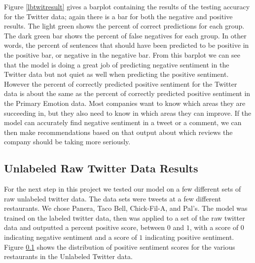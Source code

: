 \documentclass[titlepage,letterpaper]{article}
\begin{document}
Figure \ref{lbtwitresult} gives a barplot containing the results of the testing accuracy for the Twitter data; again there is a bar for both the negative and positive results. The light green shows the percent of correct predictions for each group. The dark green bar shows the percent of false negatives for each group. In other words, the percent of sentences that should have been predicted to be positive in the positive bar, or negative in the negative bar. From this barplot we can see that the model is doing a great job of predicting negative sentiment in the Twitter data but not quiet as well when predicting the positive sentiment. However the percent of correctly predicted positive sentiment for the Twitter data is about the same as the percent of correctly predicted positive sentiment in the Primary Emotion data. Most companies want to know which areas they are succeeding in, but they also need to know in which areas they can improve. If the model can accurately find negative sentiment in a tweet or a comment, we can then make recommendations based on that output about which reviews the company should be taking more seriously. 



\subsection{Unlabeled Raw Twitter Data Results}


\label{twitmeg}

For the next step in this project we tested our model on a few different sets of raw unlabeled twitter data. The data sets were tweets at a few different restaurants. We chose Panera, Taco Bell, Chick-Fil-A, and Pal's. The model was trained on the labeled twitter data, then was applied to a set of the raw twitter data and outputted a percent positive score, between $0$ and $1$, with a score of $0$ indicating negative sentiment and a score of $1$ indicating positive sentiment. Figure \ref{twitmeg} shows the distribution of positive sentiment scores for the various restaurants in the Unlabeled Twitter data.
\end{document}
